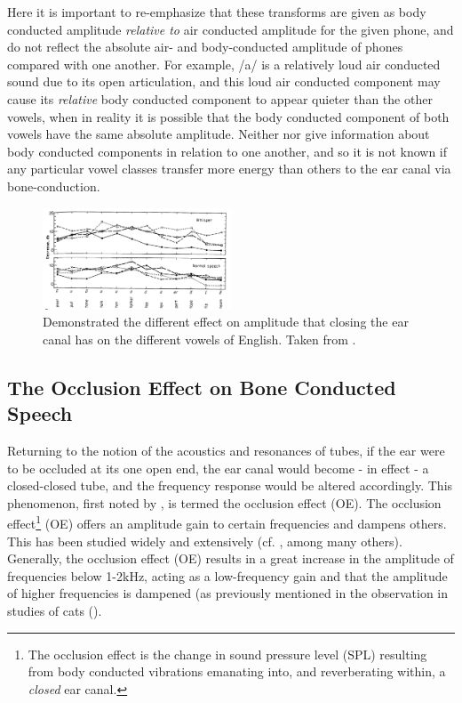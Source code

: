 \documentclass[dissertation,copyright]{uathesis}
\begin{document}
Here it is important to re-emphasize that these transforms are given as body conducted amplitude \textit{relative to} air conducted amplitude for the given phone, and do not reflect the absolute air- and body-conducted amplitude of phones compared with one another.  For example, /a/ is a relatively loud air conducted sound due to its open articulation, and this loud air conducted component may cause its \textit{relative} body conducted component to appear quieter than the other vowels, when in reality it is possible that the body conducted component of both vowels have the same absolute amplitude.  Neither \cite{bekesy:60} nor \cite{reinfeldt:10} give information about body conducted components in relation to one another, and so it is not known if any particular vowel classes transfer more energy than others to the ear canal via bone-conduction.


\begin{figure}
\includegraphics[width=0.5\textwidth]{figure/bekesy60-3.png}
\caption{Demonstrated the different effect on amplitude that closing the ear canal has on the different vowels of English.  Taken from \cite{bekesy:60}.}
\label{bekesyPhoneDiff}
\end{figure}

\subsection{The Occlusion Effect on Bone Conducted Speech}

Returning to the notion of the acoustics and resonances of tubes, if the ear were to be occluded at its one open end, the ear canal would become - in effect - a closed-closed tube, and the frequency response would be altered accordingly.  This phenomenon, first noted by \cite{wheatstone:79}, is termed the occlusion effect (OE).  The occlusion effect\footnote{The occlusion effect is the change in sound pressure level (SPL) resulting from body conducted vibrations emanating into, and reverberating within, a \textit{closed} ear canal.} (OE) offers an amplitude gain to certain frequencies and dampens others.  This has been studied widely and extensively (cf. \cite{wheatstone:79,kelly:37,littler:52,goldstein:65}, among many others).  Generally, the occlusion effect (OE) results in a great increase in the amplitude of frequencies below 1-2kHz, acting as a low-frequency gain and that the amplitude of higher frequencies is dampened (as previously mentioned in the observation in studies of cats (\cite{tonndorf:72}).
\end{document}
